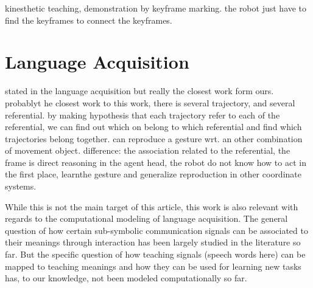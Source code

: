 \cite{akgun12hri} kinesthetic teaching, demonstration by keyframe marking. the robot just have to find the keyframes to connect the keyframes.


\section{Language Acquisition}
\label{chapter:related:language}


stated in the language acquisition but really the closest work form ours.
\cite{cederborg2011imitating} probablyt he closest work to this work, there is several trajectory, and several referential. by making hypothesis that each trajectory refer to each of the referential, we can find out which on belong to which referential and find which trajectories belong together. can reproduce a gesture wrt. an other combination of movement object. 
difference: the association related to the referential, the frame is direct reasoning in the agent head, the robot do not know how to act in the first place, learnthe gesture and generalize reproduction in other coordinate systems.

While this is not the main target of this article, this work is also relevant with regards to the computational modeling of language acquisition. The general question of how certain sub-symbolic communication signals can be associated to their meanings through interaction has been largely studied in the literature so far. But the specific question of how teaching signals (speech words here) can be mapped to teaching meanings and how they can be used for learning new tasks has, to our knowledge, not been modeled computationally so far. 

